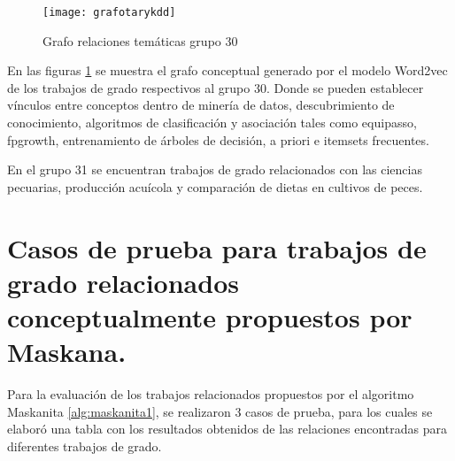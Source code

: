 \begin{figure}[H]\centering
\texttt{[image: grafotarykdd]}
\caption{Grafo  relaciones temáticas grupo 30 }
\label{fig:tarygradfo}
\end{figure}

En las figuras \ref{fig:tarygradfo}  se muestra el grafo conceptual generado por el modelo Word2vec de los trabajos de grado respectivos al  grupo 30. Donde se pueden establecer vínculos entre conceptos dentro de minería de datos, descubrimiento de conocimiento, algoritmos de clasificación y asociación tales como equipasso, fpgrowth, entrenamiento de  árboles  de decisión, a priori e itemsets frecuentes.

En el grupo 31 se encuentran trabajos de grado relacionados con las ciencias pecuarias, producción acuícola y comparación de dietas en cultivos de peces.



\section{Casos de prueba para trabajos de grado relacionados conceptualmente propuestos por Maskana.}


Para la evaluación de los trabajos relacionados propuestos por el algoritmo Maskanita \ref{alg:maskanita1}, se realizaron 3 casos de prueba, para los cuales se elaboró una tabla con los resultados obtenidos de las relaciones encontradas para diferentes trabajos de grado.


